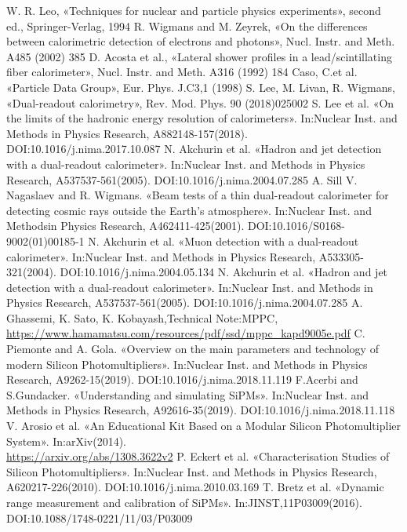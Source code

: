 \documentclass[a4paper,11pt,titlepage,oneside,openright]{book}	%
\begin{document}
\begin{backmatter}
\begin{thebibliography}{99}
			  W. R. Leo, «Techniques for nuclear and particle physics experiments»,  second ed., Springer-Verlag, 1994
			 R.  Wigmans  and  M.  Zeyrek, «On  the  differences  between  calorimetric  detection  of electrons and photons», Nucl. Instr. and Meth. A485 (2002) 385
			 D. Acosta et al., «Lateral shower profiles in a lead/scintillating fiber calorimeter», Nucl. Instr. and Meth. A316 (1992) 184
			  Caso, C.et al. «Particle Data Group», Eur. Phys. J.C3,1 (1998)
			 S. Lee, M. Livan, R. Wigmans, «Dual-readout calorimetry», Rev. Mod. Phys. 90 (2018)025002
			 S. Lee et al. «On the limits of the hadronic energy resolution of calorimeters». In:Nuclear Inst. and Methods in Physics Research, A882148-157(2018).  DOI:10.1016/j.nima.2017.10.087
			 N. Akchurin et al. «Hadron and jet detection with a dual-readout calorimeter». In:Nuclear Inst. and Methods in Physics Research, A537537-561(2005).  DOI:10.1016/j.nima.2004.07.285
			 A. Sill V. Nagaslaev and R. Wigmans. «Beam tests of a thin dual-readout calorimeter for detecting cosmic rays outside the Earth’s atmosphere». In:Nuclear Inst. and Methodsin Physics Research, A462411-425(2001).  DOI:10.1016/S0168-9002(01)00185-1
			 N. Akchurin et al. «Muon detection with a dual-readout calorimeter». In:Nuclear Inst. and Methods in Physics Research, A533305-321(2004).  DOI:10.1016/j.nima.2004.05.134
			 N. Akchurin et al. «Hadron and jet detection with a dual-readout calorimeter». In:Nuclear Inst. and Methods in Physics Research, A537537-561(2005).  DOI:10.1016/j.nima.2004.07.285
			 A. Ghassemi, K. Sato, K. Kobayash,Technical Note:MPPC, \\
			\url{https://www.hamamatsu.com/resources/pdf/ssd/mppc_kapd9005e.pdf}
			 C. Piemonte and A. Gola. «Overview on the main parameters and technology of modern Silicon Photomultipliers». In:Nuclear Inst. and Methods in Physics Research, A9262-15(2019).    DOI:10.1016/j.nima.2018.11.119
			 F.Acerbi and S.Gundacker. «Understanding and simulating SiPMs». In:Nuclear Inst. and Methods in Physics Research, A92616-35(2019).    DOI:10.1016/j.nima.2018.11.118
			 V. Arosio et al. «An Educational Kit Based on a Modular Silicon Photomultiplier System». In:arXiv(2014).\\ 
			\url{https://arxiv.org/abs/1308.3622v2}
			 P. Eckert et al. «Characterisation Studies of Silicon Photomultipliers». In:Nuclear Inst. and Methods in Physics Research, A620217-226(2010).    DOI:10.1016/j.nima.2010.03.169
			 T. Bretz et al. «Dynamic range measurement and calibration of SiPMs». In:JINST,11P03009(2016).    DOI:10.1088/1748-0221/11/03/P03009
			

\end{thebibliography}
\end{backmatter}
\end{document}
